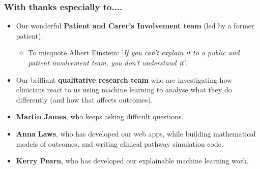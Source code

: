 \begin{frame}
\frametitle{With thanks especially to....}

\begin{itemize}
    \setlength{\itemsep}{2.mm}
    \item Our wonderful \textbf{Patient and Carer's Involvement team} (led by a former patient).
    \begin{itemize}
        \item To misquote Albert Einstein: `\textit{If you can't explain it to a public and patient involvement team, you don't understand it'}.
    \end{itemize}
    \item Our brilliant \textbf{qualitative research team} who are investigating how clinicians react to us using machine learning to analyse what they do differently (and how that affects outcomes).
    \item \textbf{Martin James}, who keeps asking difficult questions.
    \item \textbf{Anna Laws}, who has developed our web apps, while building mathematical models of outcomes, and writing clinical pathway simulation code.
    \item \textbf{Kerry Pearn}, who has developed our explainable machine learning work.
    
\end{itemize}

\end{frame}